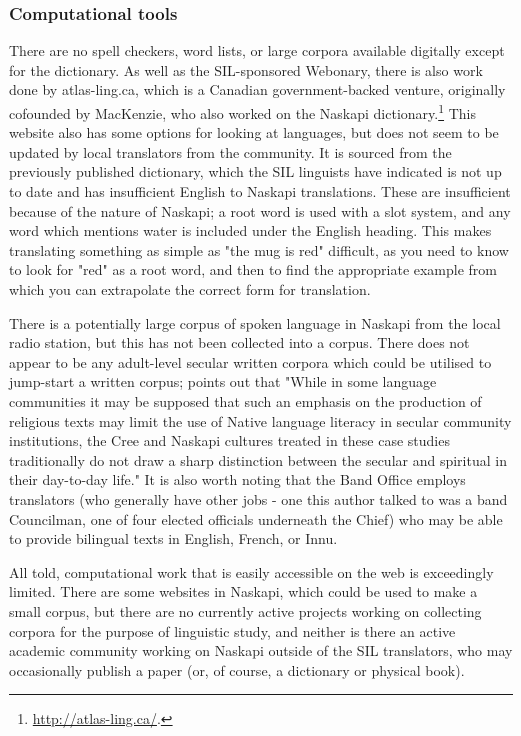 \subsubsection{Computational tools}

There are no spell checkers, word lists, or large corpora available digitally except for the dictionary. As well as the SIL-sponsored Webonary, there is also work done by atlas-ling.ca, which is a Canadian government-backed venture, originally cofounded by MacKenzie, who also worked on the Naskapi dictionary.\footnote{\href{http://atlas-ling.ca/}{http://atlas-ling.ca/}. }
This website also has some options for looking at languages, but does not seem to be updated by local translators from the community. It is sourced from the previously published dictionary, which the SIL linguists have indicated is not up to date and has insufficient English to Naskapi translations. These are insufficient because of the nature of Naskapi; a root word is used with a slot system, and any word which mentions water is included under the English heading. This makes translating something as simple as "the mug is red" difficult, as you need to know to look for "red" as a root word, and then to find the appropriate example from which you can extrapolate the correct form for translation.

There is a potentially large corpus of spoken language in Naskapi from the local radio station, but this has not been collected into a corpus. There does not appear to be any adult-level secular written corpora which could be utilised to jump-start a written corpus; \citet{jancewicz2002applied} points out that "While in some language communities it may be supposed that such an emphasis on the production of religious texts may limit the use of Native language literacy in secular community institutions, the Cree and Naskapi cultures treated in these case studies traditionally do not draw a sharp distinction between the secular and spiritual in their day-to-day life." It is also worth noting that the Band Office employs translators (who generally have other jobs - one this author talked to was a band Councilman, one of four elected officials underneath the Chief) who may be able to provide bilingual texts in English, French, or Innu.

All told, computational work that is easily accessible on the web is exceedingly limited. There are some websites in Naskapi, which could be used to make a small corpus, but there are no currently active projects working on collecting corpora for the purpose of linguistic study, and neither is there an active academic community working on Naskapi outside of the SIL translators, who may occasionally publish a paper (or, of course, a dictionary or physical book).

